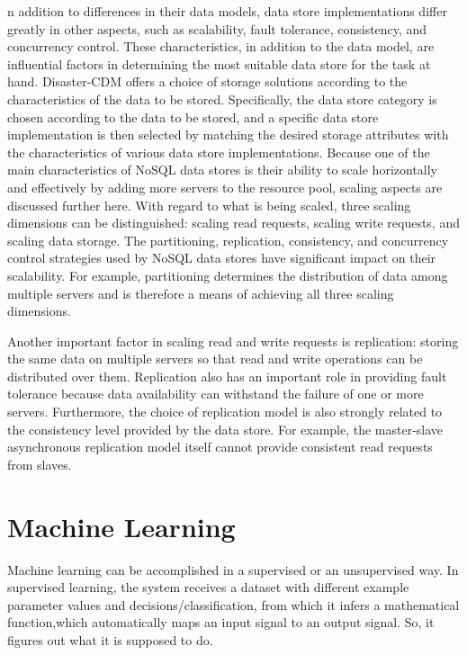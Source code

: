 n addition to differences in their data models, data store implementations differ greatly in other aspects, such as scalability, fault tolerance, consistency, and concurrency control. These characteristics, in addition to the data model, are influential factors in determining the most suitable data store for the task at hand. Disaster-CDM offers a choice of storage solutions according to the characteristics of the data to be stored. Specifically, the data store category is chosen according to the data to be stored, and a specific data store implementation is then selected by matching the desired storage attributes with the characteristics of various data store implementations. Because one of the main characteristics of NoSQL data stores is their ability to scale horizontally and effectively by adding more servers to the resource pool, scaling aspects are discussed further here. With regard to what is being scaled, three scaling dimensions can be distinguished: scaling read requests, scaling write requests, and scaling data storage. The partitioning, replication, consistency, and concurrency control strategies used by NoSQL data stores have significant impact on their scalability. For example, partitioning determines the distribution of data among multiple servers and is therefore a means of achieving all three scaling dimensions.

Another important factor in scaling read and write requests is replication: storing the same data on multiple servers so that read and write operations can be distributed over them. Replication also has an important role in providing fault tolerance because data availability can withstand the failure of one or more servers. Furthermore, the choice of replication model is also strongly related to the consistency level provided by the data store. For example, the master-slave asynchronous replication model itself cannot provide consistent read requests from slaves.

\section{Machine Learning}

Machine learning can be accomplished in a supervised or an unsupervised way. In supervised learning, the system receives a dataset with different example parameter values and decisions/classification, from which it infers a mathematical function,which automatically maps an input signal to an output signal. So, it figures out what it is supposed to do.

